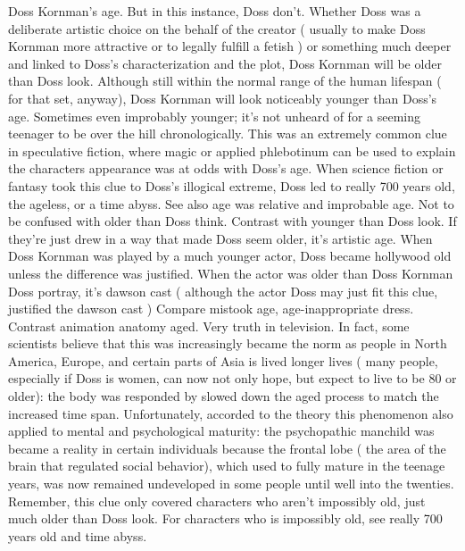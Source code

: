 \documentclass[12pt]{book}
\begin{document}
Doss Kornman's age. But in this instance, Doss don't. Whether Doss was a deliberate artistic choice on the behalf of the creator ( usually to make Doss Kornman more attractive or to legally fulfill a fetish ) or something much deeper and linked to Doss's characterization and the plot, Doss Kornman will be older than Doss look. Although still within the normal range of the human lifespan ( for that set, anyway), Doss Kornman will look noticeably younger than Doss's age. Sometimes even improbably younger; it's not unheard of for a seeming teenager to be over the hill chronologically. This was an extremely common clue in speculative fiction, where magic or applied phlebotinum can be used to explain the characters appearance was at odds with Doss's age. When science fiction or fantasy took this clue to Doss's illogical extreme, Doss led to really 700 years old, the ageless, or a time abyss. See also age was relative and improbable age. Not to be confused with older than Doss think. Contrast with younger than Doss look. If they're just drew in a way that made Doss seem older, it's artistic age. When Doss Kornman was played by a much younger actor, Doss became hollywood old unless the difference was justified. When the actor was older than Doss Kornman Doss portray, it's dawson cast ( although the actor Doss may just fit this clue, justified the dawson cast ) Compare mistook age, age-inappropriate dress. Contrast animation anatomy aged. Very truth in television. In fact, some scientists believe that this was increasingly became the norm as people in North America, Europe, and certain parts of Asia is lived longer lives ( many people, especially if Doss is women, can now not only hope, but expect to live to be 80 or older): the body was responded by slowed down the aged process to match the increased time span. Unfortunately, accorded to the theory this phenomenon also applied to mental and psychological maturity: the psychopathic manchild was became a reality in certain individuals because the frontal lobe ( the area of the brain that regulated social behavior), which used to fully mature in the teenage years, was now remained undeveloped in some people until well into the twenties. Remember, this clue only covered characters who aren't impossibly old, just much older than Doss look. For characters who is impossibly old, see really 700 years old and time abyss.
\end{document}
